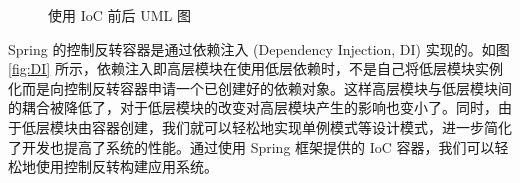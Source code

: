 \begin{figure}[!ht]
\centering
\subfloat[使用 IoC 前]{
	\centering
    \begin{tikzpicture}
        \begin{class}{高层模块}{0,0}
            \attribute{低层模块 : 依赖}
            \operation{高层模块方法 : 返回值}
            \end{class}
            
            \begin{class}{低层模块}{7.5,0}
            \attribute{属性}
            \operation{方法}
            \end{class}
            
            \aggregation{高层模块}{}{依赖}{低层模块}
    \end{tikzpicture}}\quad
{}
\caption{使用 IoC 前后 UML 图}
\label{fig:beforeAndAfter}
\end{figure}

Spring 的控制反转容器是通过依赖注入 (Dependency Injection, DI) 实现的。如图 \ref{fig:DI} 所示，依赖注入即高层模块在使用低层依赖时，不是自己将低层模块实例化而是向控制反转容器申请一个已创建好的依赖对象\cite{prasanna2009dependency}。这样高层模块与低层模块间的耦合被降低了，对于低层模块的改变对高层模块产生的影响也变小了。同时，由于低层模块由容器创建，我们就可以轻松地实现单例模式等设计模式，进一步简化了开发也提高了系统的性能。通过使用 Spring 框架提供的 IoC 容器，我们可以轻松地使用控制反转构建应用系统。

